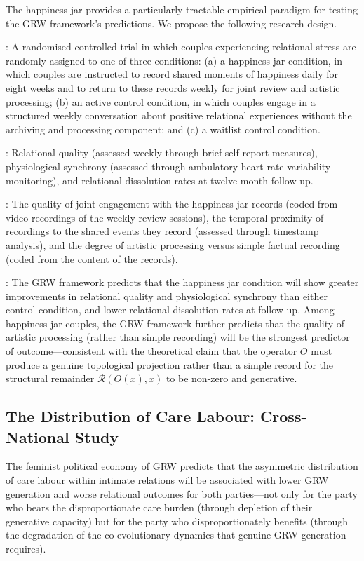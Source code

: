 \noindent
The happiness jar provides a particularly tractable empirical paradigm for testing the GRW framework's predictions. We propose the following research design.

: A randomised controlled trial in which couples experiencing relational stress are randomly assigned to one of three conditions: (a) a happiness jar condition, in which couples are instructed to record shared moments of happiness daily for eight weeks and to return to these records weekly for joint review and artistic processing; (b) an active control condition, in which couples engage in a structured weekly conversation about positive relational experiences without the archiving and processing component; and (c) a waitlist control condition.

: Relational quality (assessed weekly through brief self-report measures), physiological synchrony (assessed through ambulatory heart rate variability monitoring), and relational dissolution rates at twelve-month follow-up.

: The quality of joint engagement with the happiness jar records (coded from video recordings of the weekly review sessions), the temporal proximity of recordings to the shared events they record (assessed through timestamp analysis), and the degree of artistic processing versus simple factual recording (coded from the content of the records).

: The GRW framework predicts that the happiness jar condition will show greater improvements in relational quality and physiological synchrony than either control condition, and lower relational dissolution rates at follow-up. Among happiness jar couples, the GRW framework further predicts that the quality of artistic processing (rather than simple recording) will be the strongest predictor of outcome---consistent with the theoretical claim that the operator $O$ must produce a genuine topological projection rather than a simple record for the structural remainder $\mathcal{R}(O(x), x)$ to be non-zero and generative.

\subsection{The Distribution of Care Labour: Cross-National Study}
\label{p15:subsec:care_labour_study}

\noindent
The feminist political economy of GRW predicts that the asymmetric distribution of care labour within intimate relations will be associated with lower GRW generation and worse relational outcomes for both parties---not only for the party who bears the disproportionate care burden (through depletion of their generative capacity) but for the party who disproportionately benefits (through the degradation of the co-evolutionary dynamics that genuine GRW generation requires).

